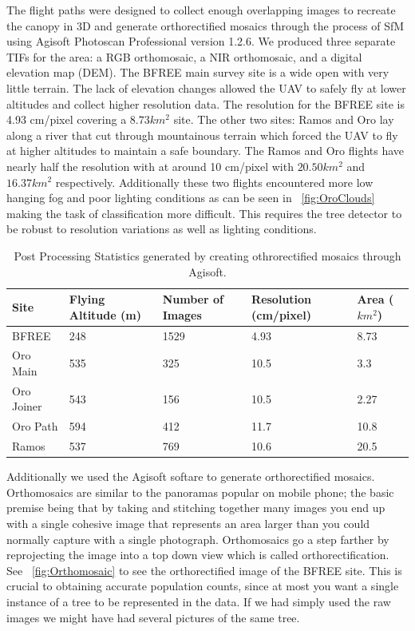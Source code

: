 The flight paths were designed to collect enough overlapping images to recreate the canopy in 3D and generate orthorectified mosaics through the process of SfM using Agisoft Photoscan Professional version 1.2.6. We produced three separate TIFs for the area: a RGB orthomosaic, a NIR orthomosaic, and a digital elevation map (DEM). The BFREE main survey site is a wide open with very little terrain. The lack of elevation changes allowed the UAV to safely fly at lower altitudes and collect higher resolution data. The resolution for the BFREE site is 4.93 cm/pixel covering a $8.73km^2$ site. The other two sites: Ramos and Oro lay along a river that cut through mountainous terrain which forced the UAV to fly at higher altitudes to maintain a safe boundary. The Ramos and Oro flights have nearly half the resolution with at around 10 cm/pixel with $20.50km^2$ and $16.37km^2$ respectively. Additionally these two flights encountered more low hanging fog and poor lighting conditions as can be seen in ~\ref{fig:OroClouds} making the task of classification more difficult. This requires the tree detector to be robust to resolution variations as well as lighting conditions.

\begin{center}
    \begin{table}[h]\footnotesize
        \caption{Post Processing Statistics generated by creating othrorectified mosaics through Agisoft.}\label{table:AgisoftStats}
        \begin{tabular}{| l | l | l | l | l |}
        \hline
        Site & Flying Altitude (m) & Number of Images & Resolution (cm/pixel) & Area ($km^2$) \\ \hline
        BFREE & 248 & 1529 & 4.93 & 8.73 \\
        Oro Main & 535 & 325 & 10.5 & 3.3 \\
        Oro Joiner & 543 & 156 & 10.5 & 2.27 \\
        Oro Path & 594 & 412 & 11.7 & 10.8 \\
        Ramos & 537 & 769 & 10.6 & 20.5 \\
        \hline
        \end{tabular}
    \end{table}
\end{center}

Additionally we used the Agisoft softare to generate orthorectified mosaics. Orthomosaics are similar to the panoramas popular on mobile phone; the basic premise being that by taking and stitching together many images you end up with a single cohesive image that represents an area larger than you could normally capture with a single photograph. Orthomosaics go a step farther by reprojecting the image into a top down view which is called orthorectification. See ~\ref{fig:Orthomosaic} to see the orthorectified image of the BFREE site. This is crucial to obtaining accurate population counts, since at most you want a single instance of a tree to be represented in the data. If we had simply used the raw images we might have had several pictures of the same tree.

